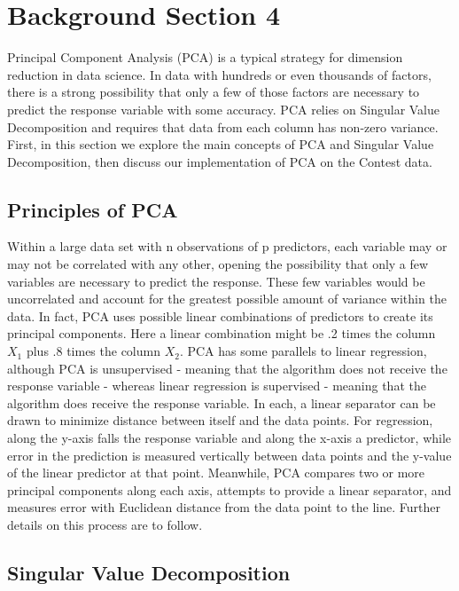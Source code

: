 \usepackage{amsmath}
\section{Background Section 4}

Principal Component Analysis (PCA) is a typical strategy for dimension reduction in data science. In data with hundreds or even thousands of factors, there is a strong possibility that only a few of those factors are necessary to predict the response variable with some accuracy. PCA relies on Singular Value Decomposition and requires that data from each column has non-zero variance. First, in this section we explore the main concepts of PCA and Singular Value Decomposition, then discuss our implementation of PCA on the Contest data.\newline

\subsection{Principles of PCA}

Within a large data set with n observations of p predictors, each variable may or may not be correlated with any other, opening the possibility that only a few variables are necessary to predict the response. These few variables would be uncorrelated and account for the greatest possible amount of variance within the data. In fact, PCA uses possible linear combinations of predictors to create its principal components. Here a linear combination might be .2 times the column $X_{1}$ plus .8 times the column $X_{2}$. PCA has some parallels to linear regression, although PCA is unsupervised - meaning that the algorithm does not receive the response variable - whereas linear regression is supervised - meaning that the algorithm does receive the response variable. In each, a linear separator can be drawn to minimize distance between itself and the data points. For regression, along the y-axis falls the response variable and along the x-axis a predictor, while error in the prediction is measured vertically between data points and the y-value of the linear predictor at that point. Meanwhile, PCA compares two or more principal components along each axis, attempts to provide a linear separator, and measures error with Euclidean distance from the data point to the line. Further details on this process are to follow. 

\subsection{Singular Value Decomposition}

